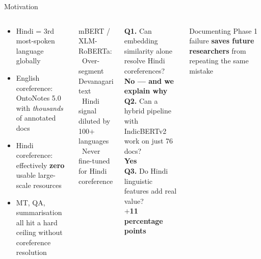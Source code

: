 \documentclass[aspectratio=169]{beamer}
\begin{document}
\begin{frame}{Motivation}
  \begin{columns}[T]
      \begin{tcolorbox}[nbox={The NLP Resource Gap}]
        \small
        \begin{itemize}\setlength\itemsep{4pt}
          \item Hindi = 3rd most-spoken language globally
          \item English coreference: OntoNotes 5.0 with
                \textit{thousands} of annotated docs
          \item Hindi coreference: effectively \textbf{zero}
                usable large-scale resources
          \item MT, QA, summarisation all hit a hard ceiling
                without coreference resolution
        \end{itemize}
      \end{tcolorbox}

      \vspace{6pt}
      \begin{tcolorbox}[wbox={Why Generic Models Fail}]
        \small
        mBERT / XLM-RoBERTa:\\[3pt]
        \textbullet\ Over-segment Devanagari text\\
        \textbullet\ Hindi signal diluted by 100$+$ languages\\
        \textbullet\ Never fine-tuned for Hindi coreference
      \end{tcolorbox}

      \begin{tcolorbox}[rbox={Three Research Questions}]
        \small
        \textbf{Q1.} Can embedding similarity alone resolve
        Hindi coreferences?\\
        \hfill\textcolor{red!70!black}{\textbf{No — and we explain why}}\\[6pt]
        \textbf{Q2.} Can a hybrid pipeline with IndicBERTv2
        work on just 76 docs?\\
        \hfill\textcolor{accentgreen}{\textbf{Yes}}\\[6pt]
        \textbf{Q3.} Do Hindi linguistic features add real value?\\
        \hfill\textcolor{accentgreen}{\textbf{$+$11 percentage points}}
      \end{tcolorbox}

      \vspace{6pt}
      \begin{tcolorbox}[nbox={Academic Value of Failure}]
        \small
        Documenting Phase 1 failure \textbf{saves future
        researchers} from repeating the same mistake
      \end{tcolorbox}
  \end{columns}
\end{frame}
\end{document}
